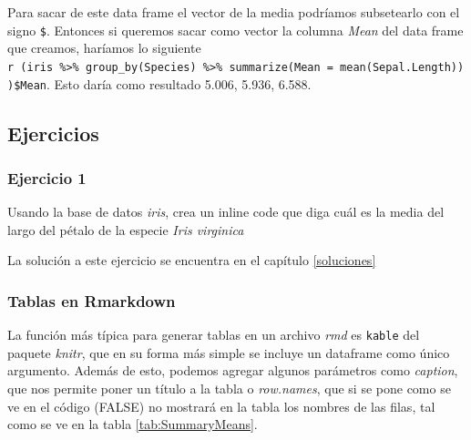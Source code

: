 \documentclass[]{book}
\newenvironment{Shaded}{\begin{snugshade}}{\end{snugshade}}
\newcommand{\DataTypeTok}[1]{\textcolor[rgb]{0.13,0.29,0.53}{#1}}
\newcommand{\KeywordTok}[1]{\textcolor[rgb]{0.13,0.29,0.53}{\textbf{#1}}}
\newcommand{\NormalTok}[1]{#1}
\newcommand{\OperatorTok}[1]{\textcolor[rgb]{0.81,0.36,0.00}{\textbf{#1}}}
\newcommand{\OtherTok}[1]{\textcolor[rgb]{0.56,0.35,0.01}{#1}}
\newcommand{\StringTok}[1]{\textcolor[rgb]{0.31,0.60,0.02}{#1}}
\begin{document}
Para sacar de este data frame el vector de la media podríamos
subsetearlo con el signo \texttt{\$}. Entonces si queremos sacar como
vector la columna \emph{Mean} del data frame que creamos, haríamos lo
siguiente
\texttt{\textasciigrave{}r\ (iris\ \%\textgreater{}\%\ group\_by(Species)\ \%\textgreater{}\%\ summarize(Mean\ =\ mean(Sepal.Length)))\$Mean\textasciigrave{}}.
Esto daría como resultado 5.006, 5.936, 6.588.

\hypertarget{ejercicios-1}{%
\subsection{Ejercicios}\label{ejercicios-1}}

\hypertarget{ejercicio-1-1}{%
\subsubsection{Ejercicio 1}\label{ejercicio-1-1}}

Usando la base de datos \emph{iris}, crea un inline code que diga cuál
es la media del largo del pétalo de la especie \emph{Iris virginica}

La solución a este ejercicio se encuentra en el capítulo
\ref{soluciones}

\hypertarget{tablas-en-rmarkdown}{%
\subsubsection{Tablas en Rmarkdown}\label{tablas-en-rmarkdown}}

La función más típica para generar tablas en un archivo \emph{rmd} es
\texttt{kable} del paquete \emph{knitr}, que en su forma más simple se
incluye un dataframe como único argumento. Además de esto, podemos
agregar algunos parámetros como \emph{caption}, que nos permite poner un
título a la tabla o \emph{row.names}, que si se pone como se ve en el
código (FALSE) no mostrará en la tabla los nombres de las filas, tal
como se ve en la tabla \ref{tab:SummaryMeans}.

\begin{Shaded}
\end{Shaded}
\end{document}
